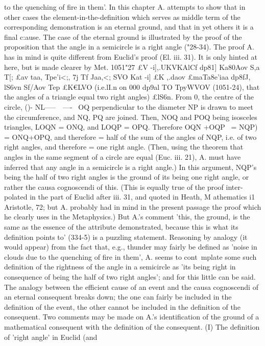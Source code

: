 {{{{{{{{{{{{{{{{{{{{{{{{{{{{{{{{{{{{{{{{{{{{{{{{{{{{{{to the quenching of fire in them'. In this chapter A. attempts to
show that in other cases the element-in-the-definition which serves
as middle term of the corresponding demonstration is an eternal
ground, and that in yet others it is a final c:ause.
The case of the eternal ground is illustrated by the proof of the
proposition that the angle in a semicircle is a right angle ("28-34).
The proof A. has in mind is quite different from Euclid's proof
(El. iii. 31). It is only hinted at here, but is made clearer by Met.
1051"27 £V -i],.UKVKAlCf dp81] Ka80Aov S,a T[; £av taa, Tpe'i<;, 7j Tf {Jaa,<;
SVO Kat -i] £K ,.daov £maTa8e'iaa dp8fJ, lS6vn Sf/Aov Tep £K€LVO (i.e.lI.n
on 000 dp9al TO Tp{yWVOV (1051-24), that the angles of a triangle
equal two right angles) £lS6n. From 0, the centre of the circle,
()-
NL-----~~----~
OQ perpendicular to the diameter NP is drawn to meet the
circumference, and NQ, PQ are joined. Then, NOQ and POQ
being isosceles triangles, LOQN = ONQ, and LOQP = OPQ.
Therefore OQN +OQP ~= NQP) = ONQ+OPQ, and therefore
= half of the sum of the angles of NQP, i.e. of two right angles,
and therefore = one right angle. (Then, using the theorem that
angles in the same segment of a circle are equal (Euc. iii. 21), A.
must have inferred that any angle in a semicircle is a right
angle.) In this argument, NQP's being the half of two right
angles is the ground of its being one right angle, or rather the
causa cognoscendi of this. (This is equally true of the proof inter-
polated in the part of Euclid after iii. 31, and quoted in Heath,
M athematics i1~ Aristotle, 72; but A. probably had in mind in the
present passage the proof which he clearly uses in the Metaphysics.)
But A.'s comment 'this, the ground, is the same as the essence
of the attribute demonstrated, because this is what its definition
points to' (334-5) is a puzzling statement. Reasoning by analogy
(it would appear) from the fact that, e.g., thunder may fairly be
defined as 'noise in clouds due to the quenching of fire in them',
A. seems to cont~mplate some such definition of the rightness of
the angle in a semicircle as 'its being right in consequence of being
the half of two right angles'; and for this little can be said. The
analogy between the efficient cause of an event and the causa
cognoscendi of an eternal consequent breaks down; the one can
fairly be included in the definition of the event, the other cannot
be included in the definition of the consequent.
Two comments may be made on A.'s identification of the
ground of a mathematical consequent with the definition of the
consequent. (I) The definition of 'right angle' in Euclid (and
}}}}}}}}}}}}}}}}}}}}}}}}}}}}}}}}}}}}}}}}}}}}}}}}}}}}}}}}
